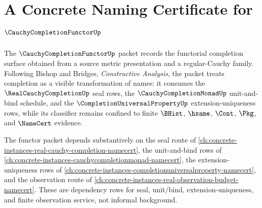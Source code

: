 \chapter{A Concrete Naming Certificate for $\CauchyCompletionFunctorUp$}
\label{ch:concrete-instances-cauchycompletionfunctor-namecert}

The $\CauchyCompletionFunctorUp$ packet records the functorial completion surface obtained from a source metric presentation and a regular-Cauchy family. Following Bishop and Bridges, \emph{Constructive Analysis}, the packet treats completion as a visible transformation of names: it consumes the $\RealCauchyCompletionUp$ seal rows, the $\CauchyCompletionMonadUp$ unit-and-bind schedule, and the $\CompletionUniversalPropertyUp$ extension-uniqueness rows, while its classifier remains confined to finite $\BHist$, $\hsame$, $\Cont$, $\Pkg$, and $\NameCert$ evidence.

The functor packet depends substantively on the seal route of \autoref{ch:concrete-instances-real-cauchy-completion-namecert}, the unit-and-bind rows of \autoref{ch:concrete-instances-cauchycompletionmonad-namecert}, the extension-uniqueness rows of \autoref{ch:concrete-instances-completionuniversalproperty-namecert}, and the observation route of \autoref{ch:concrete-instances-real-observation-budget-namecert}. These are dependency rows for seal, unit/bind, extension-uniqueness, and finite observation service, not informal background.

